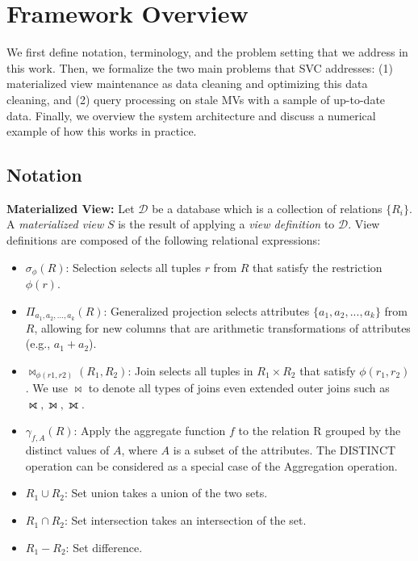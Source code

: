 \vspace{-1em}
\section{Framework Overview}\label{sec-arch}
We first define notation, terminology, and the problem setting that we address in this work.
Then, we formalize the two main problems that SVC addresses: (1) materialized view maintenance as data cleaning and optimizing this data cleaning, and (2) query processing on stale MVs with a sample of up-to-date data.
Finally, we overview the system architecture and discuss a numerical example of how this works in practice.

\subsection{Notation}\label{notation}
\noindent \textbf{Materialized View:} Let $\mathcal{D}$ be a database which is a collection of relations $\{R_i\}$. A \emph{materialized view} $S$ is the result of applying a \emph{view definition} to $\mathcal{D}$. 
View definitions are composed of the following relational expressions:
\begin{itemize}[noitemsep] \sloppy
	\item $\sigma_{\phi}(R)$: Selection selects all tuples $r$ from $R$ that satisfy the restriction $\phi (r)$.
	\item $\Pi_{a_1,a_2,...,a_k}(R)$: Generalized projection selects attributes $\{a_1,a_2,...,a_k\}$ from $R$, allowing for new columns that are arithmetic transformations of attributes (e.g., $a_1+a_2$).
	\item $\bowtie_{\phi (r1,r2)}(R_1,R_2)$: Join selects all tuples in $R_1 \times R_2$ that satisfy $\phi (r_1,r_2)$. We use $\bowtie$ to denote all types of joins even extended outer joins such as $\rightouterjoin,\leftouterjoin,\fullouterjoin$.
	\item $\gamma_{f,A}(R)$: Apply the aggregate function $f$ to the relation R grouped by the distinct values of $A$, where $A$ is a subset of the attributes. %
	The DISTINCT operation can be considered as a special case of the Aggregation operation. 
	\item $R_1 \cup R_2$: Set union takes a union of the two sets.
	\item $R_1 \cap R_2$: Set intersection takes an intersection of the set.
	\item $R_1 - R_2$: Set difference.
\end{itemize}
